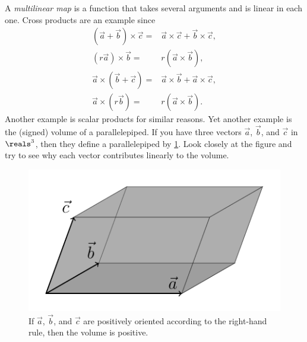 A \emph{multilinear map} is a function that takes several arguments and is linear in each one.
Cross products are an example since
\begin{align*}
	(\vec{a} + \vec{b}) \times \vec{c} ={}& \vec{a} \times \vec{c} + \vec{b} \times \vec{c},\\
	(r \vec{a}) \times \vec{b} ={}& r (\vec{a} \times \vec{b}),\\
	\vec{a} \times (\vec{b} + \vec{c}) ={}& \vec{a} \times \vec{b} + \vec{a} \times \vec{c},\\
	\vec{a} \times (r \vec{b}) ={}& r (\vec{a} \times \vec{b}).
\end{align*}
Another example is scalar products for similar reasons.
Yet another example is the (signed) volume of a parallelepiped.
If you have three vectors $\vec a$, $\vec b$, and $\vec c$ in $\reals^3$, then they define a parallelepiped by \cref{fig:parallelepiped}.
Look closely at the figure and try to see why each vector contributes linearly to the volume.

\begin{figure}[ht]
	\centering
	\includegraphics[]{figures/parallelepiped.pdf}
	\caption{If $\vec a$, $\vec b$, and $\vec c$ are positively oriented according to the right-hand rule, then the volume is positive.}%
	\label{fig:parallelepiped}
\end{figure}

